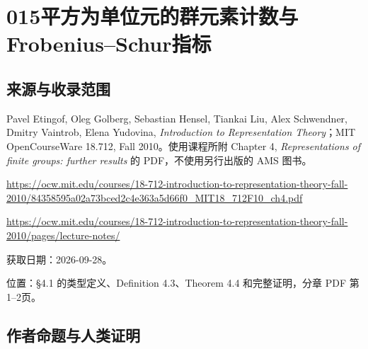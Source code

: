 \documentclass[UTF8,11pt]{ctexart}
\theoremstyle{definition}
\begin{document}
\section*{015\quad 平方为单位元的群元素计数与Frobenius--Schur指标}
\subsection*{来源与收录范围}
Pavel Etingof, Oleg Golberg, Sebastian Hensel, Tiankai Liu, Alex Schwendner, Dmitry Vaintrob, Elena Yudovina, \emph{Introduction to Representation Theory}；MIT OpenCourseWare 18.712, Fall 2010。使用课程所附 Chapter 4, \emph{Representations of finite groups: further results} 的 PDF，不使用另行出版的 AMS 图书。
\par\url{https://ocw.mit.edu/courses/18-712-introduction-to-representation-theory-fall-2010/84358595a02a73bced2c4e363a5d66f0_MIT18_712F10_ch4.pdf}
\par\url{https://ocw.mit.edu/courses/18-712-introduction-to-representation-theory-fall-2010/pages/lecture-notes/}
\par 获取日期：2026-09-28。\par 位置：\S4.1 的类型定义、Definition 4.3、Theorem 4.4 和完整证明，分章 PDF 第1--2页。
\subsection*{作者命题与人类证明}
\end{document}
